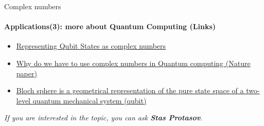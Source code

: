 \documentclass[aspectratio=169]{beamer}
\begin{document}
\begin{frame}[t]{Complex numbers}
\framesubtitle{Applications(3): more about Quantum Computing (Links)}
\Large
\begin{itemize}
    \item \href{https://qiskit.org/textbook/ch-states/representing-qubit-states.html}{Representing Qubit States as complex numbers}
    \item \href{https://www.nature.com/articles/s41586-021-04160-4}{Why do we have to use complex numbers in Quantum computing (Nature paper)}
    \item \href{https://en.wikipedia.org/wiki/Bloch_sphere}{Bloch sphere is a geometrical representation of the pure state space of a two-level quantum mechanical system (qubit)}
\end{itemize}
\textit{If you are interested in the topic, you can ask \textbf{Stas Protasov}}.
    
\end{frame}
\end{document}
